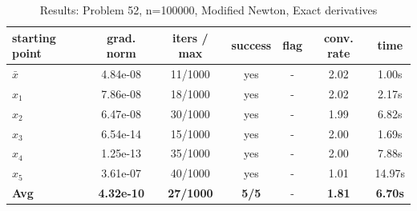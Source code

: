 \begin{longtable}{|l|c|c|c|c|c|c|}
\caption{Results: Problem 52, n=100000, Modified Newton, Exact derivatives} \\
\hline
\textbf{starting point} & \textbf{grad. norm} & \textbf{iters / max} & \textbf{success} & \textbf{flag} & \textbf{conv. rate} & \textbf{time} \\
\hline
\endfirsthead
\endhead
\endfoot
\hline
\endlastfoot
$\bar{x}$ & 4.84e-08 & 11/1000 & yes & - & 2.02 & 1.00s \\
\hline
$x_1$ & 7.86e-08 & 18/1000 & yes & - & 2.02 & 2.17s \\
\hline
$x_2$ & 6.47e-08 & 30/1000 & yes & - & 1.99 & 6.82s \\
\hline
$x_3$ & 6.54e-14 & 15/1000 & yes & - & 2.00 & 1.69s \\
\hline
$x_4$ & 1.25e-13 & 35/1000 & yes & - & 2.00 & 7.88s \\
\hline
$x_5$ & 3.61e-07 & 40/1000 & yes & - & 1.01 & 14.97s \\
\hline
\hline\hline
\textbf{Avg} & \textbf{4.32e-10} & \textbf{27/1000} & \textbf{5/5} & - & \textbf{1.81} & \textbf{6.70s} \\
\hline\hline
\end{longtable}


